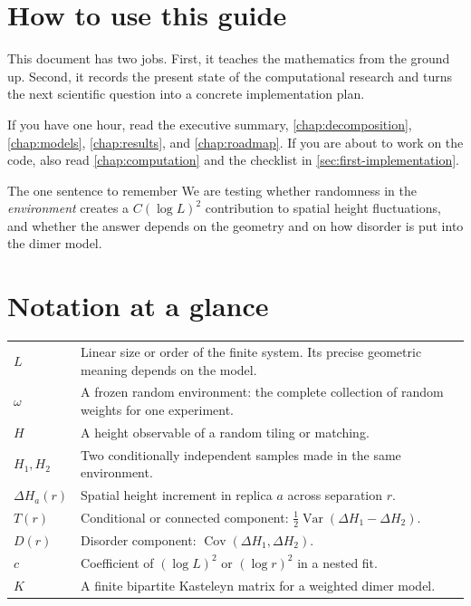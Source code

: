 \documentclass[11pt,a4paper,oneside,openany]{memoir}
\newcommand{\Var}{\operatorname{Var}}
\newcommand{\Cov}{\operatorname{Cov}}
\newcommand{\1}{\bm{1}}
\begin{document}
\frontmatter
\chapter*{How to use this guide}

This document has two jobs. First, it teaches the mathematics from the ground
up. Second, it records the present state of the computational research and
turns the next scientific question into a concrete implementation plan.

If you have one hour, read the executive summary, \cref{chap:decomposition},
\cref{chap:models}, \cref{chap:results}, and \cref{chap:roadmap}. If you are
about to work on the code, also read \cref{chap:computation} and the checklist
in \cref{sec:first-implementation}.

\begin{bigidea}{The one sentence to remember}
We are testing whether randomness in the \emph{environment} creates a
$C(\log L)^2$ contribution to spatial height fluctuations, and whether the
answer depends on the geometry and on how disorder is put into the dimer
model.
\end{bigidea}

\tableofcontents*

\chapter*{Notation at a glance}

\begin{tabularx}{\textwidth}{>{\bfseries\color{Navy}}l X}
$L$ & Linear size or order of the finite system. Its precise geometric meaning depends on the model.\\
$\omega$ & A frozen random environment: the complete collection of random weights for one experiment.\\
$H$ & A height observable of a random tiling or matching.\\
$H_1,H_2$ & Two conditionally independent samples made in the same environment.\\
$\Delta H_a(r)$ & Spatial height increment in replica $a$ across separation $r$.\\
$T(r)$ & Conditional or connected component: $\tfrac12\Var(\Delta H_1-\Delta H_2)$.\\
$D(r)$ & Disorder component: $\Cov(\Delta H_1,\Delta H_2)$.\\
$c$ & Coefficient of $(\log L)^2$ or $(\log r)^2$ in a nested fit.\\
$K$ & A finite bipartite Kasteleyn matrix for a weighted dimer model.\\
\end{tabularx}
\end{document}
